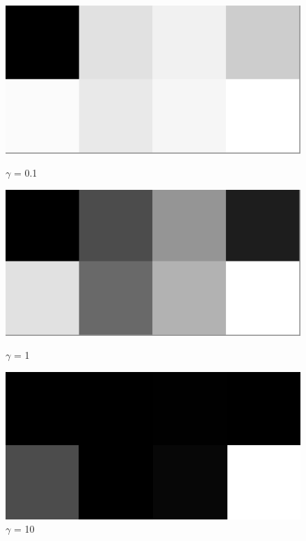 \documentclass[course=erap]{aspdoc}
\begin{document}
\begin{figure}[h]
\begin{minipage}{0.3\textwidth}
\centering
\includegraphics[width=\textwidth]{Bilder/gamma0.1.pgm.png}
\caption{$\gamma$ = 0.1}
\end{minipage}
\hfill
\begin{minipage}{0.3\textwidth}
\centering
\includegraphics[width=\textwidth]{Bilder/gamma1.pgm.png}
\caption{$\gamma$ = 1}
\end{minipage}
\hfill
\begin{minipage}{0.3\textwidth}
\centering
\includegraphics[width=\textwidth]{Bilder/gamma10.pgm.png}
\caption{$\gamma$ = 10}
\end{minipage}
\end{figure}
\end{document}
